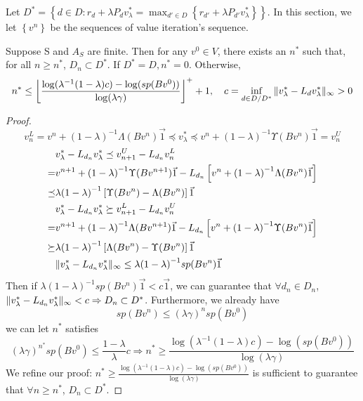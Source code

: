 Let $ D^* = \left\{ d \in D: r_d + \lambda P_{d} v^*_{\lambda} = \max_{d' \in D} \left\{ r_{d'} + \lambda P_{d'} v^*_{\lambda} \right\} \right\} $.
In this section, we let $ \left\{ v^n \right\} $ be the sequences of value iteration's sequence.

\begin{theorem}
    Suppose S and $ A_S $ are finite. Then for any $ v^0 \in V $, there exists an $ n^* $ such that, for all $ n \ge n^* $, $ D_{n} \subset D^* $. If $ D^* = D, n^* = 0 $. Otherwise,
    \[
        n^* \le \left\lfloor \frac{\log(\lambda^{-1}(1-\lambda)c) - \log(sp(Bv^0))}{\log(\lambda \gamma)}  \right\rfloor^{+} + 1,
        \quad 
        c = \inf_{d \in D\slash D^*} \Arrowvert v^*_{\lambda} - L_{d}v^{*}_{\lambda} \Arrowvert_{\infty} > 0
    \]
    \begin{proof}
        \[
            v_n^L = v^n + {(1 - \lambda)}^{-1} \Lambda(Bv^n) \vec{1} \preceq v^*_{\lambda} \preceq
            v^n + {(1 - \lambda)}^{-1}\Upsilon(Bv^n) \vec{1} = v^{U}_n
        \]
        \begin{align*}
            &v^*_{\lambda} - L_{d_n} v^*_{\lambda} \preceq v^{U}_{n+1} - L_{d_n}v^L_{n}\\
            =& v^{n+1} + {(1 - \lambda)}^{-1} \Upsilon(Bv^{n+1}) \vec{1}
            - L_{d_n}\left[ v^n + {(1 - \lambda)}^{-1} \Lambda(B v^{n})\vec{1} \right]\\
            \preceq& \lambda {(1 - \lambda)}^{-1}\left[ \Upsilon(B v^n) - \Lambda(Bv^n) \right] \vec{1}\\
            &v^*_{\lambda} - L_{d_n} v^*_{\lambda} \succeq v^{L}_{n+1} - L_{d_n}v^U_{n}\\
            =& v^{n+1} + {(1 - \lambda)}^{-1} \Lambda(Bv^{n+1}) \vec{1}
            - L_{d_n}\left[ v^n + {(1 - \lambda)}^{-1} \Upsilon(B v^{n})\vec{1} \right]\\
            \succeq& \lambda {(1 - \lambda)}^{-1}\left[ \Lambda(B v^n) - \Upsilon(Bv^n) \right] \vec{1}\\
            &\Arrowvert v^*_{\lambda} - L_{d_n} v^*_{\lambda}  \Arrowvert_\infty 
            \le \lambda{(1-\lambda)}^{-1} sp(Bv^n) \vec{1}
        \end{align*}
        Then if $ \lambda{(1-\lambda)}^{-1} sp(Bv^n) \vec{1} < c \vec{1} $, we can guarantee that  $ \forall d_n \in D_n$, $ \Arrowvert v^*_{\lambda} - L_{d_n} v^*_{\lambda} \Arrowvert_{\infty} < c \Rightarrow D_n \subset D^* $. Furthermore, we already have
        \[
            sp(B v^n) \le {(\lambda \gamma)}^{n} sp(B v^0)
        \]
        we can let $ n^* $ satisfies
        \[
            {(\lambda \gamma)}^{n^*} sp(Bv^0) \le \frac{1 - \lambda}{\lambda} c \Rightarrow
            n^{*} \ge \frac{\log(\lambda^{-1}(1 - \lambda)c) - \log(sp(Bv^0))}{\log(\lambda\gamma)} 
        \]
        We refine our proof: $ n^* \ge \frac{\log(\lambda^{-1}(1 - \lambda)c) - \log(sp(Bv^0))}{\log(\lambda\gamma)} $ is sufficient to guarantee that $ \forall n \ge n^* $, $ D_n \subset D^* $.
    \end{proof}
\end{theorem}

